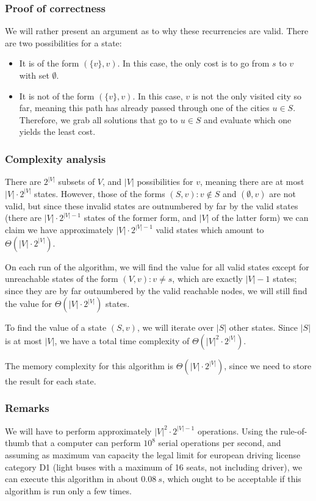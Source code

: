 \subsubsection{Proof of correctness}
We will rather present an argument as to why these recurrencies are valid. There are two possibilities for a state:
\begin{itemize}
    \item It is of the form $(\{v\}, v)$. In this case, the only cost is to go from $s$ to $v$ with set $\emptyset$.
    \item It is not of the form $(\{v\}, v)$. In this case, $v$ is not the only visited city so far, meaning this path has already passed through one of the cities $u \in S$. Therefore, we grab all solutions that go to $u \in S$ and evaluate which one yields the least cost.
\end{itemize}
\subsubsection{Complexity analysis}
There are $2^{|V|}$ subsets of $V$, and $|V|$ possibilities for $v$, meaning there are at most $|V| \cdot 2^{|V|}$ states. However, those of the forms $(S, v)\colon v \not \in S$ and $(\emptyset, v)$ are not valid, but since these invalid states are outnumbered by far by the valid states (there are $|V|\cdot 2^{|V|-1}$ states of the former form, and $|V|$ of the latter form) we can claim we have approximately $|V|\cdot 2^{|V|-1}$ valid states which amount to $\Theta(|V|\cdot 2^{|V|})$.\par
On each run of the algorithm, we will find the value for all valid states except for unreachable states of the form $(V, v)\colon v \neq s$, which are exactly $|V|-1$ states; since they are by far outnumbered by the valid reachable nodes, we will still find the value for $\Theta(|V|\cdot 2^{|V|})$ states.\par
To find the value of a state $(S,v)$, we will iterate over $|S|$ other states. Since $|S|$ is at most $|V|$, we have a total time complexity of $\Theta (|V|^2 \cdot 2^{|V|})$.\par
The memory complexity for this algorithm is $\Theta (|V| \cdot 2^{|V|})$, since we need to store the result for each state.
\subsubsection{Remarks}
We will have to perform approximately $|V|^2\cdot 2^{|V|-1}$ operations. Using the rule-of-thumb that a computer can perform $10^8$ serial operations per second, and assuming as maximum van capacity the legal limit for european driving license category D1 (light buses with a maximum of 16 seats, not including driver)\cite{dir-2006-126-ec}, we can execute this algorithm in about $\SI{0.08}{s}$, which ought to be acceptable if this algorithm is run only a few times.
